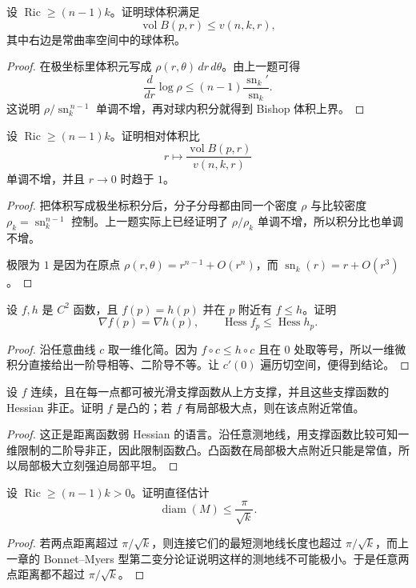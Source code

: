 \documentclass[11pt,a4paper,openany]{ctexbook}
\numberwithin{equation}{chapter}
\begin{document}
\begin{problem}
设 \(\operatorname{Ric}\ge (n-1)k\)。证明球体积满足
\[
\operatorname{vol} B(p,r)\le v(n,k,r),
\]
其中右边是常曲率空间中的球体积。
\end{problem}
\begin{proof}
在极坐标里体积元写成 \(\rho(r,\theta)\,dr\,d\theta\)。由上一题可得
\[
\frac{d}{dr}\log \rho\le (n-1)\frac{\operatorname{sn}_k'}{\operatorname{sn}_k}.
\]
这说明 \(\rho/\operatorname{sn}_k^{\,n-1}\) 单调不增，再对球内积分就得到 Bishop 体积上界。
\end{proof}

\begin{problem}
设 \(\operatorname{Ric}\ge (n-1)k\)。证明相对体积比
\[
r\longmapsto \frac{\operatorname{vol}B(p,r)}{v(n,k,r)}
\]
单调不增，并且 \(r\to0\) 时趋于 \(1\)。
\end{problem}
\begin{proof}
把体积写成极坐标积分后，分子分母都由同一个密度 \(\rho\) 与比较密度 \(\rho_k=\operatorname{sn}_k^{n-1}\) 控制。上一题实际上已经证明了 \(\rho/\rho_k\) 单调不增，所以积分比也单调不增。

极限为 \(1\) 是因为在原点 \(\rho(r,\theta)=r^{n-1}+O(r^n)\)，而 \(\operatorname{sn}_k(r)=r+O(r^3)\)。
\end{proof}

\begin{problem}
设 \(f,h\) 是 \(C^2\) 函数，且 \(f(p)=h(p)\) 并在 \(p\) 附近有 \(f\le h\)。证明
\[
\nabla f(p)=\nabla h(p),\qquad \operatorname{Hess}f_p\le \operatorname{Hess}h_p.
\]
\end{problem}
\begin{proof}
沿任意曲线 \(c\) 取一维化简。因为 \(f\circ c\le h\circ c\) 且在 \(0\) 处取等号，所以一维微积分直接给出一阶导相等、二阶导不等。让 \(c'(0)\) 遍历切空间，便得到结论。
\end{proof}

\begin{problem}
设 \(f\) 连续，且在每一点都可被光滑支撑函数从上方支撑，并且这些支撑函数的 Hessian 非正。证明 \(f\) 是凸的；若 \(f\) 有局部极大点，则在该点附近常值。
\end{problem}
\begin{proof}
这正是距离函数弱 Hessian 的语言。沿任意测地线，用支撑函数比较可知一维限制的二阶导非正，因此限制函数凸。凸函数在局部极大点附近只能是常值，所以局部极大立刻强迫局部平坦。
\end{proof}

\begin{problem}
设 \(\operatorname{Ric}\ge (n-1)k>0\)。证明直径估计
\[
\operatorname{diam}(M)\le \frac{\pi}{\sqrt{k}}.
\]
\end{problem}
\begin{proof}
若两点距离超过 \(\pi/\sqrt{k}\)，则连接它们的最短测地线长度也超过 \(\pi/\sqrt{k}\)，而上一章的 Bonnet--Myers 型第二变分论证说明这样的测地线不可能极小。于是任意两点距离都不超过 \(\pi/\sqrt{k}\)。
\end{proof}
\end{document}
